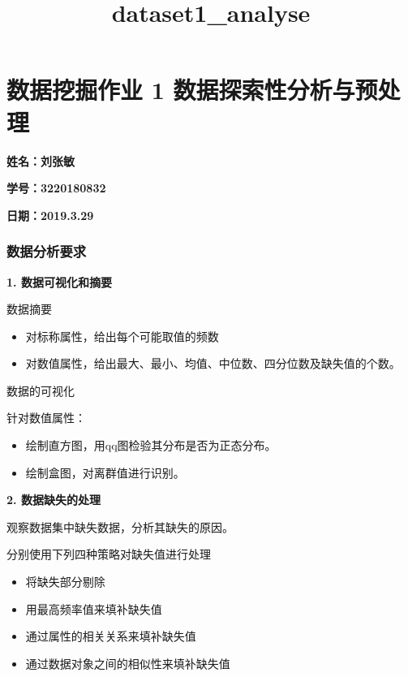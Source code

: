 \documentclass[11pt]{article}
\title{dataset1\_analyse}
\providecommand{\tightlist}{%
      \setlength{\itemsep}{0pt}\setlength{\parskip}{0pt}}
\begin{document}
    
    
    \maketitle
    
    

    
    \section{数据挖掘作业 1
数据探索性分析与预处理}\label{ux6570ux636eux6316ux6398ux4f5cux4e1a-1-ux6570ux636eux63a2ux7d22ux6027ux5206ux6790ux4e0eux9884ux5904ux7406}

\textbf{姓名：刘张敏}

\textbf{学号：3220180832}

\textbf{日期：2019.3.29}

    \subsubsection{数据分析要求}\label{ux6570ux636eux5206ux6790ux8981ux6c42}

\textbf{1. 数据可视化和摘要}

数据摘要

\begin{itemize}
\item
  对标称属性，给出每个可能取值的频数
\item
  对数值属性，给出最大、最小、均值、中位数、四分位数及缺失值的个数。
\end{itemize}

数据的可视化

针对数值属性：

\begin{itemize}
\item
  绘制直方图，用qq图检验其分布是否为正态分布。
\item
  绘制盒图，对离群值进行识别。
\end{itemize}

\textbf{2. 数据缺失的处理}

观察数据集中缺失数据，分析其缺失的原因。

分别使用下列四种策略对缺失值进行处理

\begin{itemize}
\tightlist
\item
  将缺失部分剔除
\item
  用最高频率值来填补缺失值
\item
  通过属性的相关关系来填补缺失值
\item
  通过数据对象之间的相似性来填补缺失值
\end{itemize}
\end{document}
